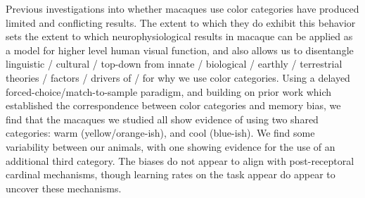 Previous investigations into whether macaques use color categories have produced limited and conflicting results. 
The extent to which they do exhibit this behavior sets the extent to which neurophysiological results in macaque can be applied as a model for higher level human visual function, and also allows us to disentangle linguistic / cultural / top-down from innate / biological / earthly / terrestrial theories / factors / drivers of / for why we use color categories.
Using a delayed forced-choice/match-to-sample paradigm, and building on prior work which established the correspondence between color categories and memory bias, we find that the macaques we studied all show evidence of using two shared categories: warm (yellow/orange-ish), and cool (blue-ish). 
We find some variability between our animals, with one showing evidence for the use of an additional third category. 
The biases do not appear to align with post-receptoral cardinal mechanisms, though learning rates on the task appear do appear to uncover these mechanisms.

